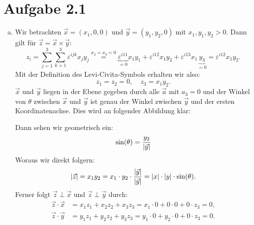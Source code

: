 \documentclass{theozettel}
\renewcommand{\epsilon}{\varepsilon}
\begin{document}

\section*{Aufgabe 2.1}
\begin{enumerate}[(a)]
	\item 	Wir betrachten $\vec{x} = (x_{1}, 0, 0)$ und $\vec{y}=(y_{1},y_{2},0)$ mit $x_{1}, y_{1}, y_{2} > 0$. Dann gilt für $\vec{z} = \vec{x} \times \vec{y}$:
			\[
				z_{i} = \sum_{j=1}^{3}\sum_{k=1}^{3} \epsilon^{ijk}x_{j}y_{j} \stackrel{x_{2}=x_{3}=0}{=} \underbrace{\epsilon^{i11}}_{= 0}x_{1}y_{1} + \epsilon^{i12}x_{1}y_{2} + \epsilon^{i13}x_{1}\underbrace{y_{3}}_{= 0} = \epsilon^{i12}x_{1}y_{2}.
			\]
			Mit der Definition des Levi-Civita-Symbols erhalten wir also:
			\[
				z_{1} = z_{2} = 0, \ \ \ \ \  z_{3} = x_{1}y_{2}.
			\]
			$\vec{x}$ und $\vec{y}$ liegen in der Ebene gegeben durch alle $\vec{a}$ mit $a_{3} = 0$ und der Winkel von $\theta$ zwischen $\vec{x}$ und $\vec{y}$ ist genau der Winkel zwischen $\vec{y}$ und der ersten Koordinatenachse. Dies wird an folgender Abbildung klar:
			\begin{figure}[h]
			\centering
			\end{figure}
			
			Dann sehen wir geometrisch ein:
			\[
				\sin(\theta) = \frac{y_{2}}{\qty|\vec{y}|}
			\]
			Woraus wir direkt folgern:
			\[
				\qty|\vec{z}| = x_{1}y_{2} =x_{1} \cdot y_{2} \cdot \frac{\qty|\vec{y}|}{\qty|\vec{y}|} = \qty|x| \cdot \qty|y| \cdot \sin(\theta).
			\]
			Ferner folgt $\vec{z} \perp \vec{x}$ und $\vec{z} \perp \vec{y}$ durch:
			\begin{align*}
				\vec{z} \cdot \vec{x} &= x_{1}z_{1} + x_{2}z_{2} + x_{3}z_{3} = x_{1} \cdot 0 + 0 \cdot 0 + 0 \cdot z_{3} = 0, \\
				\vec{z} \cdot \vec{y} &= y_{1}z_{1} + y_{2}z_{2} + y_{3}z_{3} = y_{1} \cdot 0 + y_{2} \cdot 0 + 0 \cdot z_{3} = 0.
			\end{align*}
			

\end{enumerate}
\end{document}
